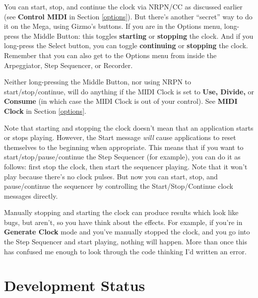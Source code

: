 \documentclass{article}
\begin{document}
		You can start, stop, and continue the clock via NRPN/CC as discussed earlier (see {\bf Control MIDI} in Section \ref{options}).   But there's another ``secret'' way to do it on the Mega, using Gizmo's buttons.  If you are in the Options menu, long-press the Middle Button: this toggles {\bf starting} or {\bf stopping} the clock.  And if you long-press the Select button, you can toggle {\bf continuing} or {\bf stopping} the clock.  Remember that you can also get to the Options menu from inside the Arpeggiator, Step Sequencer, or Recorder.
		
		Neither long-pressing the Middle Button, nor using NRPN to start/stop/continue, will do anything if the MIDI Clock is set to {\bf Use, Divide,} or {\bf Consume} (in which case the MIDI Clock is out of your control).  See {\bf MIDI Clock} in Section \ref{options}.
				
		Note that starting and stopping the clock doesn't mean that an application starts or stops playing.  However, the Start message {\it will} cause applications to reset themselves to the beginning when appropriate.   This means that if you want to start/stop/pause/continue the Step Sequencer (for example), you can do it as follows: first stop the clock, then start the sequencer playing.  Note that it won't play because there's no clock pulses.  But now you can start, stop, and pause/continue the sequencer by controlling the Start/Stop/Continue clock messages directly.
		
		Manually stopping and starting the clock can produce results which look like bugs, but aren't, so you have think about the effects.  For example, if you're in {\bf Generate Clock} mode and you've manually stopped the clock, and you go into the Step Sequencer and start playing, nothing will happen. More than once this has confused me enough to look through the code thinking I'd written an error.
		


\section{Development Status}
\end{document}
